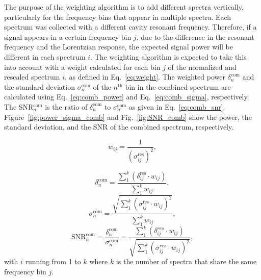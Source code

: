 The purpose of the weighting algorithm is to add different spectra vertically,
 particularly for the frequency bins that appear in multiple spectra.  
Each spectrum was collected with a different cavity resonant frequency. 
Therefore, if a signal appears in a certain frequency bin $j$, due to the
 difference in the resonant frequency and the Lorentzian response, the 
expected signal
 power will be different in each spectrum $i$. The weighting algorithm is 
expected to take this into account with a weight calculated for each bin $j$ of
 the normalized and rescaled spectrum $i$, as defined in Eq.~\eqref{eq:weight}.
The weighted power $\delta^\text{com}_{n}$ and the standard deviation 
$\sigma^\text{com}_{n}$ of the $n^\text{th}$ bin in the combined spectrum are 
calculated using Eq.~\eqref{eq:comb_power} and Eq.~\eqref{eq:comb_sigma}, 
respectively. The SNR$^\text{com}_{n}$ is the ratio of 
$\delta^\text{com}_{n}$ to 
$\sigma^\text{com}_{n}$ as given in Eq.~\eqref{eq:comb_snr}. 
Figure~\ref{fig:power_sigma_comb} and Fig.~\ref{fig:SNR_comb} show the power, 
the standard deviation, and the SNR of the combined spectrum, respectively.


\begin{equation}
    \label{eq:weight}
    {w_{ij}} = \frac{1}{(\sigma_{ij}^\text{res})^{2}},
\end{equation}

\begin{equation}
    \label{eq:comb_power}
    \delta_{n}^\text{com} = \frac{ \sum_{1}^{k}\left(\delta_{ij}^\text{res} \cdot {w_{ij}}\right)}{\sum_{1}^{k} {w_{ij}}},
\end{equation}
\begin{equation}
    \label{eq:comb_sigma}
    \sigma_{n}^\text{com} = \frac{ \sqrt{\sum_{1}^{k}(\sigma_{ij}^\text{res} \cdot {w_{ij}})^2}}{\sum_{1}^{k} {w_{ij}}},
\end{equation}
\begin{equation}
    \label{eq:comb_snr}
    \text{SNR}_{n}^\text{com} = \frac{\delta^\text{com}_{n}}{\sigma^\text{com}_{n}}= \frac{\sum_{1}^{k}\left(\delta_{ij}^{res} \cdot {w_{ij}}\right)}{ \sqrt{\sum_{1}^{k}(\sigma_{ij}^{res} \cdot {w_{ij}})^2}},
\end{equation}
with $i$ running from 1 to $k$ where $k$ is the 
number of spectra that share the same frequency bin $j$.

